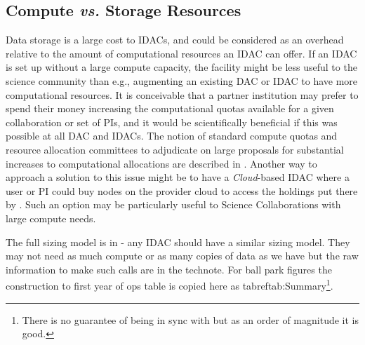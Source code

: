 \subsection{Compute {\it vs.} Storage Resources} \label{sec:cvs}
Data storage is a large cost to IDACs, and could be considered as an overhead relative to the amount of computational resources an \gls{IDAC} can offer. If an \gls{IDAC} is set up without a large compute capacity, the facility might be less useful to the science community than e.g., augmenting an existing DAC or \gls{IDAC} to have more computational resources. It is conceivable that a partner institution may prefer to spend their money increasing the computational quotas available for a given collaboration or set of PIs, and it would be scientifically beneficial if this was possible at all DAC and IDACs. The notion of standard compute quotas and resource allocation committees to adjudicate on large proposals for substantial increases to computational allocations are described in . Another way to approach a solution to this issue might be to have a \emph{Cloud}-based \gls{IDAC} where a user or \gls{PI} could buy nodes on the provider cloud to access the holdings put there by \RO.  Such an option may be particularly useful to Science Collaborations with large compute needs.

The full sizing model is in  - any \gls{IDAC} should have a similar sizing model. They may not need as much compute or as many copies of data as we have but the raw information to make such calls are in the technote.  For ball park figures the construction
to first year of ops table is copied here as tabref{tab:Summary}\footnote{ There is no guarantee of being in sync with  but as an order of magnitude it is good.}.


